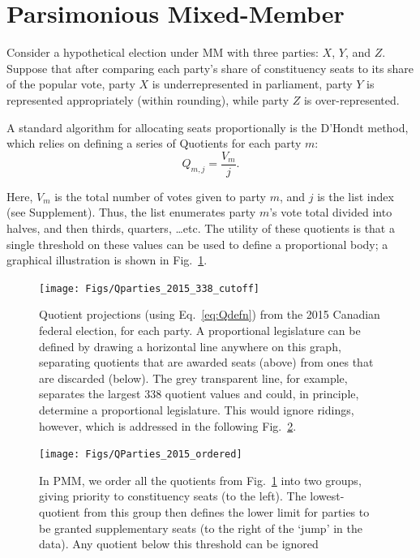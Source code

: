 \documentclass[DIV=calc, paper=a4, fontsize=11pt, twocolumn]{scrartcl}	 %
\begin{document}
\section{Parsimonious Mixed-Member}
\label{sec:model_proposal}

Consider a hypothetical election under MM with three parties: $X$, $Y$, and $Z$. Suppose that after comparing each party's share of constituency seats to its share of the popular vote, party $X$ is underrepresented in parliament, party $Y$ is represented appropriately (within rounding), while party $Z$ is over-represented. 

A standard algorithm for allocating seats proportionally is the D'Hondt method, which relies on defining a series of Quotients for each party $m$:
\begin{equation}
\label{eq:Qdefn}
Q_{m,j} = \frac{V_m}{j}.
\end{equation}

Here, $V_m$ is the total number of votes given to party $m$, and $j$ is the list index (see Supplement). 
Thus, the list enumerates party $m$'s vote total divided into halves, and then thirds, quarters, \ldots etc. The utility of these quotients is that a single threshold on these values can be used to define a proportional body; a graphical illustration is shown in Fig.~\ref{fig:Qparties_2015_338_cutoff}. 


\begin{figure}[h!]
  \texttt{[image: Figs/Qparties\_2015\_338\_cutoff]}
  \captionsetup{format=default}
  \caption{Quotient projections (using Eq.~\ref{eq:Qdefn}) from the 2015 Canadian federal election, for each party. A proportional legislature can be defined by drawing a horizontal line anywhere on this graph, separating quotients that are awarded seats (above) from ones that are discarded (below). The grey transparent line, for example, separates the largest 338 quotient values and could, in principle, determine a proportional legislature. This would ignore ridings, however, which is addressed in the following Fig.~\ref{fig:QParties_2015_ordered}. }
\label{fig:Qparties_2015_338_cutoff}
\end{figure}

\begin{figure}[h!]
  \texttt{[image: Figs/QParties\_2015\_ordered]}
  \captionsetup{format=default}
  \caption{ In PMM, we order all the quotients from Fig.~\ref{fig:Qparties_2015_338_cutoff} into two groups, giving priority to constituency seats (to the left). The lowest-quotient from this group then defines the lower limit for parties to be granted supplementary seats (to the right of the `jump' in the data). Any quotient below this threshold can be ignored }
\label{fig:QParties_2015_ordered}
\end{figure}
\end{document}
